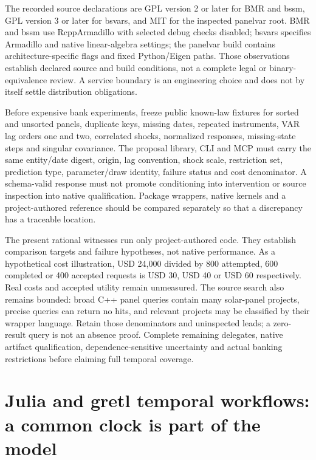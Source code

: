 The recorded source declarations are GPL version 2 or later for BMR and bssm, GPL version 3 or later for bsvars, and MIT for the inspected panelvar root. BMR and bssm use RcppArmadillo with selected debug checks disabled; bsvars specifies Armadillo and native linear-algebra settings; the panelvar build contains architecture-specific flags and fixed Python/Eigen paths. Those observations establish declared source and build conditions, not a complete legal or binary-equivalence review. A service boundary is an engineering choice and does not by itself settle distribution obligations.~\citep{exec25_cdyn_bmr,exec25_cdyn_bsvars,exec25_cdyn_bssm,exec25_cdyn_panelvar}

Before expensive bank experiments, freeze public known-law fixtures for sorted and unsorted panels, duplicate keys, missing dates, repeated instruments, VAR lag orders one and two, correlated shocks, normalized responses, missing-state steps and singular covariance. The proposal library, CLI and MCP must carry the same entity/date digest, origin, lag convention, shock scale, restriction set, prediction type, parameter/draw identity, failure status and cost denominator. A schema-valid response must not promote conditioning into intervention or source inspection into native qualification. Package wrappers, native kernels and a project-authored reference should be compared separately so that a discrepancy has a traceable location.~\citep{exec25_cdyn_choice}

The present rational witnesses run only project-authored code. They establish comparison targets and failure hypotheses, not native performance. As a hypothetical cost illustration, USD 24,000 divided by 800 attempted, 600 completed or 400 accepted requests is USD 30, USD 40 or USD 60 respectively. Real costs and accepted utility remain unmeasured. The source search also remains bounded: broad C++ panel queries contain many solar-panel projects, precise queries can return no hits, and relevant projects may be classified by their wrapper language. Retain those denominators and uninspected leads; a zero-result query is not an absence proof. Complete remaining delegates, native artifact qualification, dependence-sensitive uncertainty and actual banking restrictions before claiming full temporal coverage.~\citep{exec25_cdyn_choice}


\section{Julia and gretl temporal workflows: a common clock is part of the model}
\label{sec:exec25-other-dynamic}

